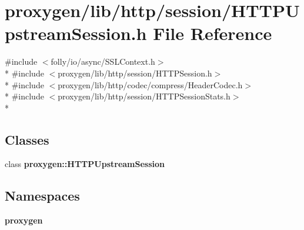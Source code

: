 \section{proxygen/lib/http/session/\+H\+T\+T\+P\+Upstream\+Session.h File Reference}
\label{HTTPUpstreamSession_8h}
{\ttfamily \#include $<$folly/io/async/\+S\+S\+L\+Context.\+h$>$}\\*
{\ttfamily \#include $<$proxygen/lib/http/session/\+H\+T\+T\+P\+Session.\+h$>$}\\*
{\ttfamily \#include $<$proxygen/lib/http/codec/compress/\+Header\+Codec.\+h$>$}\\*
{\ttfamily \#include $<$proxygen/lib/http/session/\+H\+T\+T\+P\+Session\+Stats.\+h$>$}\\*
\subsection*{Classes}
\begin{DoxyCompactItemize}
\item 
class {\bf proxygen\+::\+H\+T\+T\+P\+Upstream\+Session}
\end{DoxyCompactItemize}
\subsection*{Namespaces}
\begin{DoxyCompactItemize}
\item 
 {\bf proxygen}
\end{DoxyCompactItemize}
